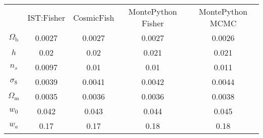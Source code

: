 \begin{table}
\centering
\begin{tabular}{|c|c|c|c|c|}
 & IST:Fisher & CosmicFish & MontePython Fisher & MontePython MCMC \\
$\Omega_\mathrm{b}$ & 0.0027 & 0.0027 & 0.0027 & 0.0026 \\
$h$ & 0.02 & 0.02 & 0.021 & 0.021 \\
$n_s$ & 0.0097 & 0.01 & 0.01 & 0.011 \\
$\sigma_8$ & 0.0039 & 0.0041 & 0.0042 & 0.0044 \\
$\Omega_\mathrm{m}$ & 0.0035 & 0.0036 & 0.0036 & 0.0038 \\
$w_0$ & 0.042 & 0.043 & 0.044 & 0.045 \\
$w_a$ & 0.17 & 0.17 & 0.18 & 0.18 \\
\end{tabular}
\end{table}
